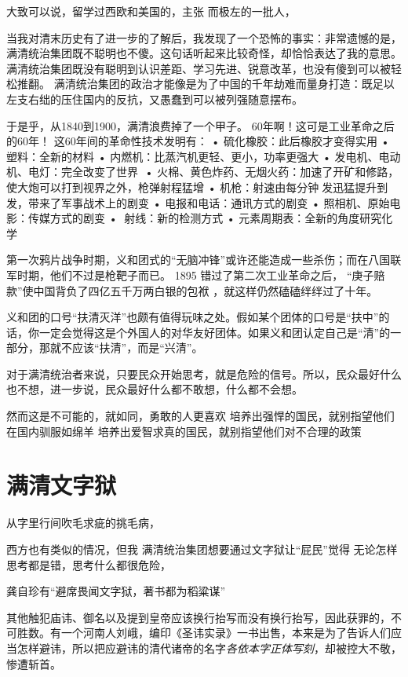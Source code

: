 大致可以说，留学过西欧和美国的，主张
而极左的一批人，


	当我对清末历史有了进一步的了解后，我发现了一个恐怖的事实：非常遗憾的是，满清统治集团既不聪明也不傻。这句话听起来比较奇怪，却恰恰表达了我的意思。满清统治集团既没有聪明到认识差距、学习先进、锐意改革，也没有傻到可以被轻松推翻。
满清统治集团的政治才能像是为了中国的千年劫难而量身打造：既足以左支右绌的压住国内的反抗，又愚蠢到可以被列强随意摆布。

于是乎，从1840到1900，满清浪费掉了一个甲子。
60年啊！这可是工业革命之后的60年！
这60年间的革命性技术发明有：
•	硫化橡胶：此后橡胶才变得实用
•	塑料：全新的材料
•	内燃机：比蒸汽机更轻、更小，功率更强大
•	发电机、电动机、电灯：完全改变了世界
•	火棉、黄色炸药、无烟火药：加速了开矿和修路，使大炮可以打到视界之外，枪弹射程猛增
•	机枪：射速由每分钟发迅猛提升到发，带来了军事战术上的剧变 
•	电报和电话：通讯方式的剧变
•	照相机、原始电影：传媒方式的剧变
•	射线：新的检测方式
•	元素周期表：全新的角度研究化学

第一次鸦片战争时期，义和团式的“无脑冲锋”或许还能造成一些杀伤；而在八国联军时期，他们不过是枪靶子而已。
1895
错过了第二次工业革命之后，
“庚子赔款”使中国背负了四亿五千万两白银的包袱 ，就这样仍然磕磕绊绊过了十年。




义和团的口号“扶清灭洋”也颇有值得玩味之处。假如某个团体的口号是“扶中”的话，你一定会觉得这是个外国人的对华友好团体。如果义和团认定自己是“清”的一部分，那就不应该“扶清”，而是“兴清”。


对于满清统治者来说，只要民众开始思考，就是危险的信号。所以，民众最好什么也不想，进一步说，民众最好什么都不敢想，什么都不会想。

然而这是不可能的，就如同，勇敢的人更喜欢
培养出强悍的国民，就别指望他们在国内驯服如绵羊
培养出爱智求真的国民，就别指望他们对不合理的政策

\section{满清文字狱}
从字里行间吹毛求疵的挑毛病，

西方也有类似的情况，但我
满清统治集团想要通过文字狱让“屁民”觉得
无论怎样思考都是错，思考什么都很危险，

龚自珍有“避席畏闻文字狱，著书都为稻粱谋”

其他触犯庙讳、御名以及提到皇帝应该换行抬写而没有换行抬写，因此获罪的，不可胜数。有一个河南人刘峨，编印《圣讳实录》一书出售，本来是为了告诉人们应当怎样避讳，所以把应避讳的清代诸帝的名字\textit{各依本字正体写刻}，却被控大不敬，惨遭斩首。 

